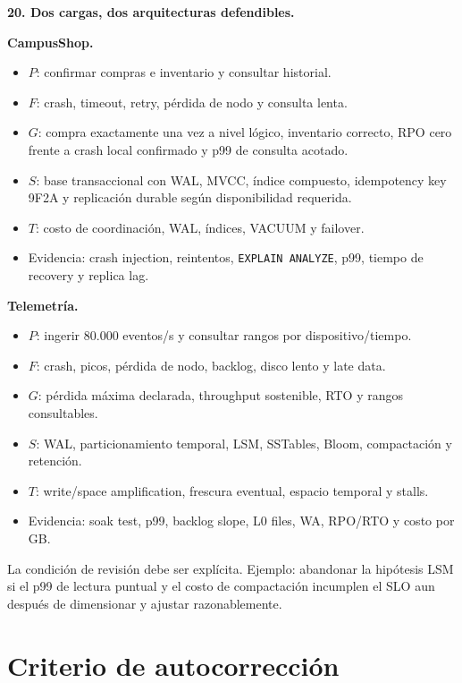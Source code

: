\documentclass[variant=guiaresuelta,cover=institutional,mode=screen]{ua-engineering-v6-article}
\begin{document}
\begin{uaexercise}
\textbf{20. Dos cargas, dos arquitecturas defendibles.}
\end{uaexercise}
\begin{uaanswer}
\textbf{CampusShop.}

\begin{itemize}
\item $P$: confirmar compras e inventario y consultar historial.
\item $F$: crash, timeout, retry, pérdida de nodo y consulta lenta.
\item $G$: compra exactamente una vez a nivel lógico, inventario correcto, RPO cero frente a crash local confirmado y p99 de consulta acotado.
\item $S$: base transaccional con WAL, MVCC, índice compuesto, idempotency key 9F2A y replicación durable según disponibilidad requerida.
\item $T$: costo de coordinación, WAL, índices, VACUUM y failover.
\item Evidencia: crash injection, reintentos, \texttt{EXPLAIN ANALYZE}, p99, tiempo de recovery y replica lag.
\end{itemize}

\textbf{Telemetría.}

\begin{itemize}
\item $P$: ingerir 80.000 eventos/s y consultar rangos por dispositivo/tiempo.
\item $F$: crash, picos, pérdida de nodo, backlog, disco lento y late data.
\item $G$: pérdida máxima declarada, throughput sostenible, RTO y rangos consultables.
\item $S$: WAL, particionamiento temporal, LSM, SSTables, Bloom, compactación y retención.
\item $T$: write/space amplification, frescura eventual, espacio temporal y stalls.
\item Evidencia: soak test, p99, backlog slope, L0 files, WA, RPO/RTO y costo por GB.
\end{itemize}

La condición de revisión debe ser explícita. Ejemplo: abandonar la hipótesis LSM si el p99 de lectura puntual y el costo de compactación incumplen el SLO aun después de dimensionar y ajustar razonablemente.
\end{uaanswer}

\section{Criterio de autocorrección}
\end{document}
